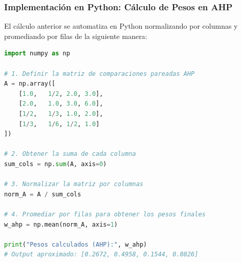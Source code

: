 \documentclass[11pt, letterpaper]{article}
\begin{document}
\subsubsection{Implementación en Python: Cálculo de Pesos en AHP}
El cálculo anterior se automatiza en Python normalizando por columnas y promediando por filas de la siguiente manera:
\begin{lstlisting}[language=Python]
import numpy as np

# 1. Definir la matriz de comparaciones pareadas AHP
A = np.array([
    [1.0,   1/2, 2.0, 3.0],
    [2.0,   1.0, 3.0, 6.0],
    [1/2,   1/3, 1.0, 2.0],
    [1/3,   1/6, 1/2, 1.0]
])

# 2. Obtener la suma de cada columna
sum_cols = np.sum(A, axis=0)

# 3. Normalizar la matriz por columnas
norm_A = A / sum_cols

# 4. Promediar por filas para obtener los pesos finales
w_ahp = np.mean(norm_A, axis=1)

print("Pesos calculados (AHP):", w_ahp)
# Output aproximado: [0.2672, 0.4958, 0.1544, 0.0826]
\end{lstlisting}
\end{document}
